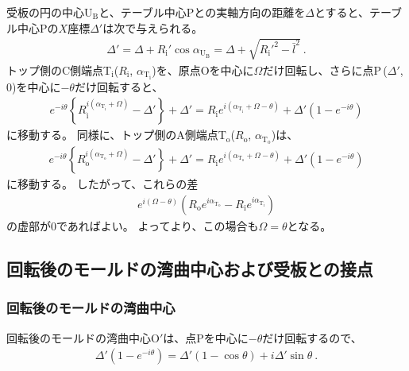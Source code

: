 受板の円の中心U$_\mathrm B$と、テーブル中心Pとの実軸方向の距離を$\varDelta$とすると、テーブル中心Pの$X$座標$\varDelta'$は次で与えられる。
\begin{align}
  \label{eq:tableCenter}
  \varDelta'
  = \varDelta+R_\mathrm i'\cos\alpha_{\mathrm U_\mathrm B} = \varDelta+\sqrt{R_\mathrm i'^2-\bar l^2}\ .
\end{align}
トップ側のC側端点T$_\mathrm i$($R_\mathrm i$, $\alpha_{\mathrm T_\mathrm i}$)を、原点Oを中心に$\Omega$だけ回転し、さらに点P\,($\varDelta'$, $0$)を中心に$-\theta$だけ回転すると、
\begin{align}
  \label{eq:afterfttable}
  e^{-i\theta}\left\{R_\mathrm i^{i(\alpha_{\mathrm T_\mathrm i}+\Omega)}-\varDelta'\right\}+\varDelta'
  = R_\mathrm ie^{i(\alpha_{\mathrm T_\mathrm i}+\Omega-\theta)}+\varDelta'\left(1-e^{-i\theta}\right)
\end{align}
に移動する。
同様に、トップ側のA側端点T$_\mathrm o$($R_\mathrm o$, $\alpha_{\mathrm T_\mathrm o}$)は、
\begin{align*}
  e^{-i\theta}\!\left\{R_\mathrm o^{i(\alpha_{\mathrm T_\mathrm o}+\Omega)}-\varDelta'\right\}+\varDelta'
  = R_\mathrm ie^{i(\alpha_{\mathrm T_\mathrm o}+\Omega-\theta)}+\varDelta'\!\left(1-e^{-i\theta}\right)
\end{align*}
に移動する。
したがって、これらの差
\begin{align*}
  e^{i(\Omega-\theta)}\!
  \left(R_\mathrm oe^{i\alpha_{\mathrm T_\mathrm o}}-R_\mathrm ie^{i\alpha_{\mathrm T_\mathrm i}}\right)
\end{align*}
の虚部が$0$であればよい。
よってより、この場合も$\Omega = \theta$となる。


\subsection{回転後のモールドの湾曲中心および受板との接点}

\subsubsection{回転後のモールドの湾曲中心}
回転後のモールドの湾曲中心O$'$は、点Pを中心に$-\theta$だけ回転するので、
\begin{align*}
  \varDelta'\!\left(1-e^{-i\theta}\right) = \varDelta'(1-\cos\theta)+i\varDelta'\sin\theta\ .
\end{align*}

